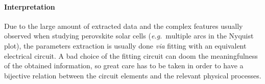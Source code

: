 	\paragraph{Interpretation}
	Due to the large amount of extracted data and the complex features usually observed when studying perovskite solar cells (\textsl{e.g.}\ multiple arcs in the Nyquist plot), the parameters extraction is usually done \textsl{via} fitting with an equivalent electrical circuit.
	A bad choice of the fitting circuit can doom the meaningfulness of the obtained information, so great care has to be taken in order to have a bijective relation between the circuit elements and the relevant physical processes.








